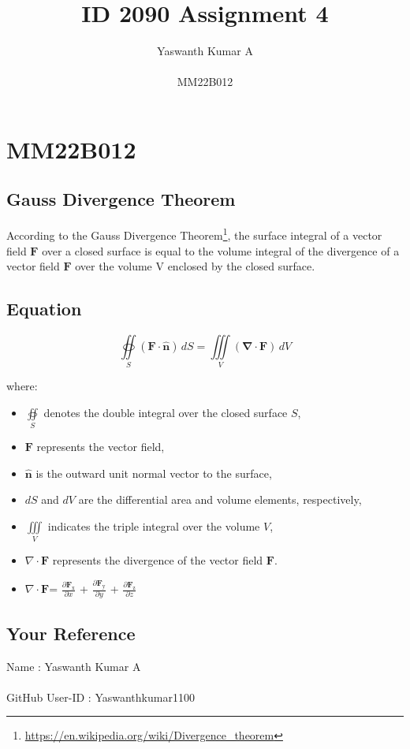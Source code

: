 \documentclass{article}
\title{ID 2090 Assignment 4}
\author{Yaswanth Kumar A \\ \\ MM22B012}
\date{}
\begin{document}
\maketitle

\section{MM22B012}

\subsection{Gauss Divergence Theorem}

According to the Gauss Divergence Theorem\footnote{\url{https://en.wikipedia.org/wiki/Divergence_theorem}}, the surface integral of a vector field $\mathbf{F}$ over a closed surface is equal to the volume integral of the divergence of a vector field $\mathbf{F}$ over the volume V enclosed by the closed surface. 
\subsection{Equation}

\[
\oiint\limits_{S} (\mathbf{F} \cdot \mathbf{\hat{n}}) \,dS = \iiint\limits_{V} (\mathbf{\nabla} \cdot \mathbf{F}) \, dV
\]

where:

\begin{itemize}
  
  \item $\oiint\limits_{S}$ denotes the double integral over the closed surface $S$,
  
  \item $\mathbf{F}$ represents the vector field,
  
  \item $\mathbf{\hat{n}}$ is the outward unit normal vector to the surface,
  
  \item $dS$ and $dV$ are the differential area and volume elements, respectively,
  
  \item $\iiint\limits_{V}$ indicates the triple integral over the volume $V$,

  \item $\nabla \cdot \mathbf{F}$ represents the divergence of the vector field $\mathbf{F}$.
  \item $\nabla \cdot \mathbf{F}$= $\frac{\partial \mathbf{F}_{\text{x}}}{\partial x}$ + $\frac{\partial \mathbf{F}_{\text{y}}}{\partial y}$ + $\frac{\partial \mathbf{F}_{\text{z}}}{\partial z}$
  


\end{itemize}


\subsection{Your Reference}
Name : Yaswanth Kumar A \\ \\
GitHub User-ID : Yaswanthkumar1100
\end{document}
